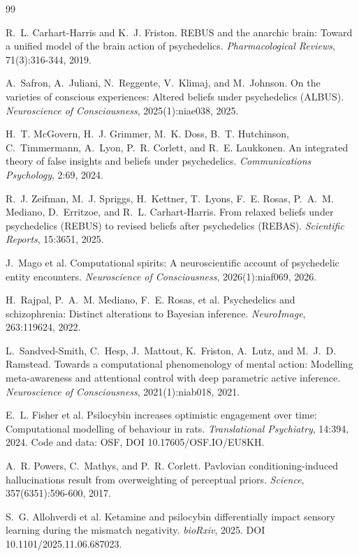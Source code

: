 \documentclass[11pt]{article}
\begin{document}
\begin{thebibliography}{99}

 R.~L. Carhart-Harris and K.~J. Friston. REBUS and the
anarchic brain: Toward a unified model of the brain action of psychedelics.
\emph{Pharmacological Reviews}, 71(3):316-344, 2019.

 A.~Safron, A.~Juliani, N.~Reggente, V.~Klimaj, and
M.~Johnson. On the varieties of conscious experiences: Altered beliefs under
psychedelics (ALBUS). \emph{Neuroscience of Consciousness}, 2025(1):niae038, 2025.

 H.~T. McGovern, H.~J. Grimmer, M.~K. Doss, B.~T.
Hutchinson, C.~Timmermann, A.~Lyon, P.~R. Corlett, and R.~E. Laukkonen. An
integrated theory of false insights and beliefs under psychedelics.
\emph{Communications Psychology}, 2:69, 2024.

 R.~J. Zeifman, M.~J. Spriggs, H.~Kettner, T.~Lyons,
F.~E. Rosas, P.~A.~M. Mediano, D.~Erritzoe, and R.~L. Carhart-Harris. From
relaxed beliefs under psychedelics (REBUS) to revised beliefs after
psychedelics (REBAS). \emph{Scientific Reports}, 15:3651, 2025.

 J.~Mago et al. Computational spirits: A neuroscientific
account of psychedelic entity encounters. \emph{Neuroscience of Consciousness},
2026(1):niaf069, 2026.

 H.~Rajpal, P.~A.~M. Mediano, F.~E. Rosas, et al.
Psychedelics and schizophrenia: Distinct alterations to Bayesian inference.
\emph{NeuroImage}, 263:119624, 2022.

 L.~Sandved-Smith, C.~Hesp, J.~Mattout, K.~Friston,
A.~Lutz, and M.~J.~D. Ramstead. Towards a computational phenomenology of mental
action: Modelling meta-awareness and attentional control with deep parametric
active inference. \emph{Neuroscience of Consciousness}, 2021(1):niab018, 2021.

 E.~L. Fisher et al. Psilocybin increases optimistic
engagement over time: Computational modelling of behaviour in rats.
\emph{Translational Psychiatry}, 14:394, 2024. Code and data: OSF,
DOI 10.17605/OSF.IO/EU8KH.

 A.~R. Powers, C.~Mathys, and P.~R. Corlett.
Pavlovian conditioning-induced hallucinations result from overweighting of
perceptual priors. \emph{Science}, 357(6351):596-600, 2017.

 S.~G. Allohverdi et al. Ketamine and psilocybin
differentially impact sensory learning during the mismatch negativity.
\emph{bioRxiv}, 2025. DOI 10.1101/2025.11.06.687023.


\end{thebibliography}
\end{document}
